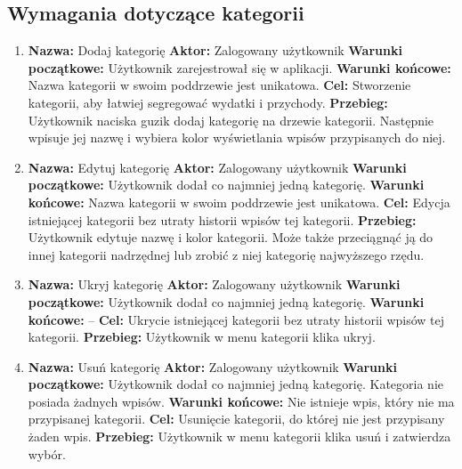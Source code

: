 \subsection{Wymagania dotyczące kategorii}
\label{subsec:wymagania-kategorie}

\begin{enumerate}[labelwidth=1em,label=\arabic*.]
\item \textbf{Nazwa:} Dodaj kategorię \newline
    \textbf{Aktor:} Zalogowany użytkownik \newline
    \textbf{Warunki początkowe:} Użytkownik zarejestrował się w aplikacji. \newline
    \textbf{Warunki końcowe:} Nazwa kategorii w swoim poddrzewie jest unikatowa. \newline
    \textbf{Cel:} Stworzenie kategorii, aby łatwiej segregować wydatki i przychody. \newline
    \textbf{Przebieg:} Użytkownik naciska guzik dodaj kategorię na drzewie kategorii. Następnie wpisuje jej nazwę i wybiera kolor wyświetlania wpisów przypisanych do niej.
\item \textbf{Nazwa:} Edytuj kategorię \newline
    \textbf{Aktor:} Zalogowany użytkownik \newline
    \textbf{Warunki początkowe:} Użytkownik dodał co najmniej jedną kategorię. \newline
    \textbf{Warunki końcowe:} Nazwa kategorii w swoim poddrzewie jest unikatowa. \newline
    \textbf{Cel:} Edycja istniejącej kategorii bez utraty historii wpisów tej kategorii. \newline
    \textbf{Przebieg:} Użytkownik edytuje nazwę i kolor kategorii. Może także przeciągnąć ją do innej kategorii nadrzędnej lub zrobić z niej kategorię najwyższego rzędu.
\item \textbf{Nazwa:} Ukryj kategorię \newline
    \textbf{Aktor:} Zalogowany użytkownik \newline
    \textbf{Warunki początkowe:} Użytkownik dodał co najmniej jedną kategorię. \newline
    \textbf{Warunki końcowe:} -- \newline
    \textbf{Cel:} Ukrycie istniejącej kategorii bez utraty historii wpisów tej kategorii. \newline
    \textbf{Przebieg:} Użytkownik w menu kategorii klika ukryj.
\item \textbf{Nazwa:} Usuń kategorię \newline
    \textbf{Aktor:} Zalogowany użytkownik \newline
    \textbf{Warunki początkowe:} Użytkownik dodał co najmniej jedną kategorię. Kategoria nie posiada żadnych wpisów. \newline
    \textbf{Warunki końcowe:} Nie istnieje wpis, który nie ma przypisanej kategorii. \newline
    \textbf{Cel:} Usunięcie kategorii, do której nie jest przypisany żaden wpis. \newline
    \textbf{Przebieg:} Użytkownik w menu kategorii klika usuń i zatwierdza wybór.
\end{enumerate}

